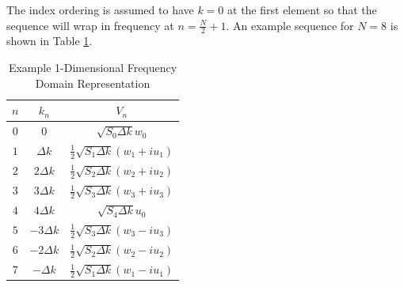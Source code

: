 The index ordering is assumed to have $k=0$ at the first element so that the sequence will wrap in frequency at $n = \frac{N}{2} + 1$. An example sequence for $N = 8$ is shown in Table \ref{os_tab:2a}.
\begin{table}[H]
  \begin{center}
      \renewcommand{\baselinestretch}{1} \small\normalsize
  \begin{quote}
    \caption[Example 1-Dimensional Frequency Domain Representation]{Example 1-Dimensional Frequency Domain Representation\label{os_tab:2a}}
  \end{quote}
  \begin{tabular} {| c | c | c |}
    \hline
  \bf{$n$} & \bf{$k_n$} & \bf{$V_n$} \\ \hline
  $0$ & $0$ & $\sqrt{S_{0} \Delta k}w_0$ \\ \hline
  $1$ & $\Delta k$ & $\frac{1}{2}\sqrt{S_1 \Delta k} \left(w_1 + iu_1 \right)$ \\ \hline
  $2$ & $2\Delta k$ & $\frac{1}{2}\sqrt{S_2\Delta k} \left(w_2 + iu_2 \right)$ \\ \hline
  $3$ & $3\Delta k$ & $\frac{1}{2}\sqrt{S_3 \Delta k} \left(w_3 + iu_3 \right)$ \\ \hline
  $4$ & $4\Delta k$ & $\sqrt{S_{4} \Delta k} u_0$ \\ \hline
  $5$ & $-3\Delta k$ & $\frac{1}{2}\sqrt{S_3 \Delta k} \left(w_3 - iu_3 \right)$ \\ \hline
  $6$ & $-2\Delta k$ & $\frac{1}{2}\sqrt{S_2 \Delta k} \left(w_2 - iu_2 \right)$  \\ \hline
  $7$ & $-\Delta k$ & $\frac{1}{2}\sqrt{S_1 \Delta k} \left(w_1 - iu_1 \right)$ \\ \hline
\end{tabular}
\end{center}
\end{table}
\renewcommand{\baselinestretch}{2} \small\normalsize


